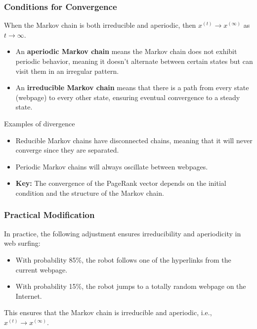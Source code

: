 \subsubsection{Conditions for Convergence}
\begin{definition}
    When the Markov chain is both irreducible and aperiodic, then $x^{(t)} \to x^{(\infty)}$ as $t \to \infty$.
    \begin{itemize}
        \item An \textbf{aperiodic Markov chain} means the Markov chain does not exhibit periodic behavior, meaning it doesn't alternate between certain states but can visit them in an irregular pattern.
        \item An \textbf{irreducible Markov chain} means that there is a path from every state (webpage) to every other state, ensuring eventual convergence to a steady state.
    \end{itemize}
\end{definition}

\begin{example} Examples of divergence
    \begin{itemize}
        \item Reducible Markov chains have disconnected chains, meaning that it will never converge since they are separated.
        \item Periodic Markov chains will always oscillate between webpages.
        \item \textbf{Key:} The convergence of the PageRank vector depends on the initial condition and the structure of the Markov chain.
    \end{itemize}
\end{example}

\subsubsection{Practical Modification}
\begin{intuition}
    In practice, the following adjustment ensures irreducibility and aperiodicity in web surfing:
    \begin{itemize}
        \item With probability 85\%, the robot follows one of the hyperlinks from the current webpage.
        \item With probability 15\%, the robot jumps to a totally random webpage on the Internet.
    \end{itemize}

This ensures that the Markov chain is irreducible and aperiodic, i.e., $x^{(t)} \to x^{(\infty)}$.
\end{intuition}

